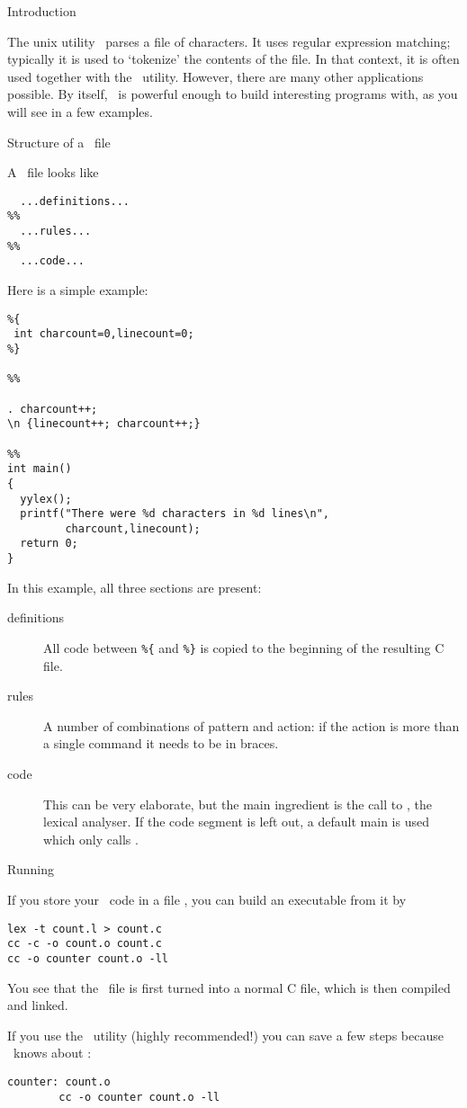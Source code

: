  {Introduction}

The unix utility \lex\ parses a file of characters. It uses regular
expression matching; typically it is used to `tokenize' the contents
of the file. In that context, it is often used together with the
\yacc\ utility. However, there are many other applications possible.
By itself, \lex\ is powerful enough to build interesting programs
with, as you will see in a few examples.

 {Structure of a \lex\ file}

A \lex\ file looks like
\begin{verbatim}
  ...definitions...
%%
  ...rules...
%%
  ...code...
\end{verbatim}
Here is a simple example:
\begin{verbatim}
%{
 int charcount=0,linecount=0;
%}

%%

. charcount++;
\n {linecount++; charcount++;}

%%
int main()
{
  yylex();
  printf("There were %d characters in %d lines\n",
         charcount,linecount);
  return 0;
}
\end{verbatim}

In this example, all three sections are present:
\begin{description}
\item[definitions] All code between \verb+%{+ and \verb+%}+
 is copied to the beginning of the resulting C file.
\item[rules] A number of combinations of pattern and action: if the
  action is more than a single command it needs to be in braces.
\item[code] This can be very elaborate, but the main ingredient is the
  call to , the lexical analyser. If the code segment is left
  out, a default main is used which only calls .
\end{description}

 {Running \lex}

If you store your \lex\ code in a file , you can build an
executable from it by
\begin{verbatim}
lex -t count.l > count.c
cc -c -o count.o count.c
cc -o counter count.o -ll
\end{verbatim}
You see that the \lex\ file is first turned into a normal C file,
which is then compiled and linked.

If you use the \make\ utility (highly recommended!) you can save a few
steps because \make\ knows about \lex:
\begin{verbatim}
counter: count.o
        cc -o counter count.o -ll
\end{verbatim}

